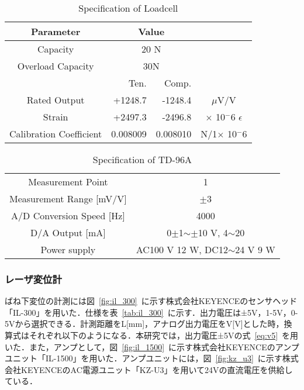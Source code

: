 \documentclass[a4paper,12pt]{article_vdlab_sotsuron}
\begin{document}
\vspace*{10mm}
\begin{table}[h]
  \begin{center}
    \caption{Specification of Loadcell}
	\label{tab:tclz}
	\begin{tabular}{crrc}\hline
	  Parameter & \multicolumn{2}{c}{Value}&\\\hline
	  Capacity & \multicolumn{2}{c}{20 N}&\\
	  Overload Capacity & \multicolumn{2}{c}{30N}&\\
	    & Ten.&Comp.\\
	  Rated Output & +1248.7 & -1248.4 & $\mu$V/V \\ 
	  Strain & +2497.3 & -2496.8 & $\times$ 10$^-6$ $\epsilon$ \\
	  Calibration Coefficient & 0.008009 & 0.008010 & N/1$\times$ 10$^-6$ \\\hline
	\end{tabular}
  \end{center}
\end{table}

\vspace*{10mm}
\begin{table}[h]
  \begin{center}
    \caption{Specification of TD-96A}
    \label{tab:td_96a}
    \begin{tabular}{cc}\hline
      Measurement Point & 1 \\
      Measurement Range [mV/V]& $\pm$3\\
      A/D Conversion Speed [Hz]& 4000\\
      D/A Output [mA]& 0$\pm$1$\sim\pm$10 V, 4$\sim$20\\
      Power supply & AC100 V 12 W, DC12$\sim$24 V 9 W \\\hline 
    \end{tabular}
  \end{center}
\end{table}

\newpage
\subsubsection{レーザ変位計}
ばね下変位の計測には図~\ref{fig:il_300}~に示す株式会社KEYENCEのセンサヘッド「IL-300」を用いた．仕様を表~\ref{tab:il_300}~に示す．出力電圧は±5V，1-5V，0-5Vから選択できる．計測距離をL[mm]，アナログ出力電圧をV[V]とした時，換算式はそれぞれ以下のようになる．本研究では，出力電圧±5Vの式~\ref{eq:v5}~を用いた．また，アンプとして，図~\ref{fig:il_1500}~に示す株式会社KEYENCEのアンプユニット「IL-1500」を用いた．アンプユニットには，図~\ref{fig:kz_u3}~に示す株式会社KEYENCEのAC電源ユニット「KZ-U3」を用いて24Vの直流電圧を供給している．
\end{document}
